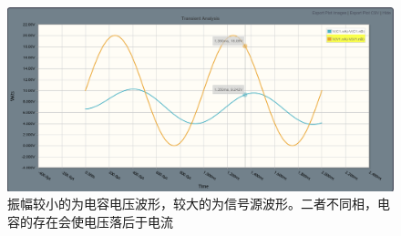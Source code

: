 \documentclass[a4paper]{article}
\begin{document}
\begin{figure}[htp]
\centering
\includegraphics[width=1\linewidth]{A4-2.png}
\caption{振幅较小的为电容电压波形，较大的为信号源波形。二者不同相，电容的存在会使电压落后于电流}
\label{A42}
\end{figure}
\end{document}
